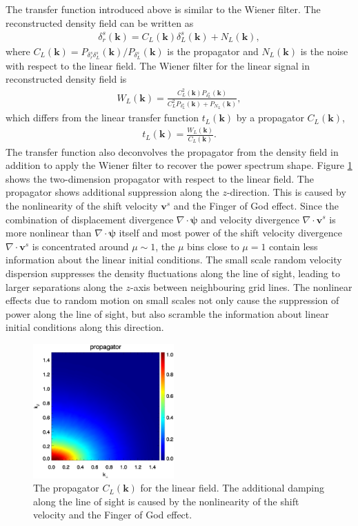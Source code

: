 \documentclass[aps,prx,twocolumn,superscriptaddress,groupedaddress,nofootinbib,amsfont]{revtex4}  %
\newcommand{\bea}{\begin{eqnarray}}
\newcommand{\eea}{\end{eqnarray}}
\newcommand{\bmp}{\bm{\psi}}
\newcommand{\bmv}{\bm{v}}
\newcommand{\bmk}{\bm{k}}
\begin{document}
The transfer function introduced above is similar to the Wiener filter. 
The reconstructed density field can be written as 
\bea
\delta_r^s(\bmk)=C_L(\bmk)\delta_L^s(\bmk)+N_L(\bmk),
\eea
where $C_L(\bmk)=P_{\delta_r^s\delta_L^s}(\bmk)/P_{\delta_L^s}(\bmk)$ is the 
propagator and $N_L(\bmk)$ is the noise with respect to the linear field. 
The Wiener filter for the linear signal in reconstructed density field is 
\bea
W_L(\bmk)=\frac{C^2_L(\bmk)P_{\delta_L^s}(\bmk)}{C_L^2P_{\delta^s_L}(\bmk)+P_{N_L}(\bmk)},
\eea
which differs from the linear transfer function $t_L(\bmk)$ by a propagator 
$C_L(\bmk)$,
\bea
t_L(\bmk)=\frac{W_L(\bmk)}{C_L(\bmk)}.
\eea
The transfer function also deconvolves the propagator from the density field 
in addition to apply the Wiener filter to recover the power spectrum shape.
Figure \ref{fig:tf_Ls} shows the two-dimension propagator with respect to the
linear field. 
The propagator shows additional suppression along the $z$-direction. 
This is caused by the nonlinearity of the shift velocity $\bmv^s$ and the Finger of God effect. Since the combination of displacement divergence $\nabla\cdot\bmp$ and velocity divergence $\nabla\cdot\bmv^s$ is more nonlinear than $\nabla\cdot\bmp$ itself and most power of the shift velocity divergence $\nabla\cdot\bmv^s$ is concentrated around $\mu\sim1$, the $\mu$ bins close to $\mu=1$ contain
less information about the linear initial conditions.
The small scale random velocity dispersion suppresses the density fluctuations
along the line of sight, leading to larger separations along the $z$-axis 
between neighbouring grid lines. 
The nonlinear effects due to random motion on small scales not only cause the 
suppression of power along the line of sight, but also scramble the information
about linear initial conditions along this direction. 

\begin{figure}[tbp]
\begin{center}
\includegraphics[width=0.48\textwidth]{0.000transf-the_deltaRsxLs_4x.eps}
\end{center}
\vspace{-0.7cm}
\caption{The propagator $C_L(\bmk)$ for the linear field. The additional damping
along the line of sight is caused by the nonlinearity of the shift velocity and the Finger of God effect.}
\label{fig:tf_Ls}
\end{figure}
\end{document}
